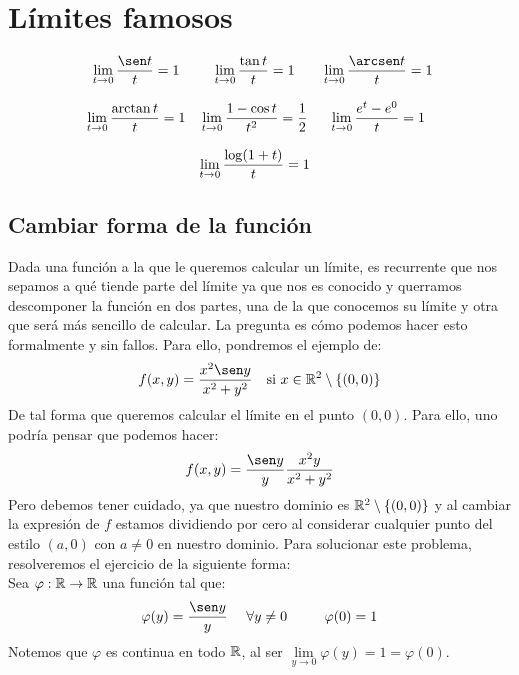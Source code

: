\section{Límites famosos}
\begin{equation*}
    \begin{array}{ccc}
        \displaystyle \lim_{t \to 0}\dfrac{\sen t}{t} = 1
        &
        \displaystyle  \lim_{t \to 0}\dfrac{\tan t}{t} = 1
        &
        \displaystyle  \lim_{t \to 0}\dfrac{\arcsen t}{t} = 1\\ \\
        \displaystyle  \lim_{t \to 0}\dfrac{\arctan t}{t} = 1
        &
        \displaystyle  \lim_{t \to 0}\dfrac{1-\cos t}{t^2} = \dfrac{1}{2}
        & 
        \displaystyle  \lim_{t \to 0}\dfrac{e^t -e^0}{t} = 1\\ \\
        &\displaystyle  \lim_{t \to 0}\dfrac{\log(1+t)}{t}=1
    \end{array}
\end{equation*}

\subsection{Cambiar forma de la función}

Dada una función a la que le queremos calcular un límite, es recurrente que nos sepamos a qué tiende
parte del límite ya que nos es conocido y querramos descomponer la función en dos partes, una
de la que conocemos su límite y otra que será más sencillo de calcular. La pregunta es cómo podemos
hacer esto formalmente y sin fallos. Para ello, pondremos el ejemplo de:
$$f(x,y) = \dfrac{x^2 \sen y}{x^2+y^2}~~\mbox{ si } x \in \R^2 \setminus\{(0,0)\}$$
De tal forma que queremos calcular el límite en el punto $(0,0)$. Para ello, uno podría pensar
que podemos hacer:
$$f(x,y) = \dfrac{\sen y}{y} \dfrac{x^2y}{x^2+y^2}$$
Pero debemos tener cuidado, ya que nuestro dominio es $\mathbb R^2\setminus\{(0,0)\}$ y al cambiar la
expresión de $f$ estamos dividiendo por cero al considerar cualquier punto del estilo $(a,0)$ con
$a \neq 0$ en nuestro dominio.
Para solucionar este problema, resolveremos el ejercicio de la siguiente forma:\\


Sea $\varphi:\mathbb R \rightarrow \mathbb R$ una función tal que:
$$\varphi(y) = \dfrac{\sen y}{y}~~~~\forall y \neq 0~~~~~~~~\varphi(0)=1$$
Notemos que $\varphi$ es continua en todo $\mathbb R$, al ser $\lim\limits_{y \to 0}\varphi(y) = 1 = \varphi(0)$.


